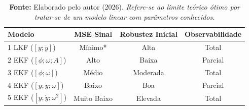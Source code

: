 \documentclass[a4paper,12pt]{article}
\begin{document}
\begin{table}[H]
    \centering
    \caption{Comparativo global de Robustez e Precisão dos Modelos da Senoide}
    \vspace{0.2cm}
    \begin{tabular}{|p{4.0cm}|c|c|c|}
        \hline
        \textbf{Modelo} & \textbf{MSE Sinal} & \textbf{Robustez Inicial} & \textbf{Observabilidade} \\ \hline
        1 LKF ($\left[y; \dot{y}\right]$)         & Mínimo*     & Alta            & Total                    \\ \hline
        2 EKF ($\left[\phi; \omega; A \right]$)   & Alto        & Baixa          & Parcial                  \\ \hline
        3  EKF ($\left[\phi; \omega\right]$)           & Médio       & Moderada       & Total                  \\ \hline
        4 EKF ($\left[y; \dot{y}; \omega \right]$)     &  Baixo      & Boa            & Parcial      \\ \hline
        5 EKF ($\left[y; \dot{y}; \omega^2\right]$) & Muito Baixo & Elevada        & Total                    \\ \hline
    \end{tabular}
    \label{tab:comparativo}
    \caption*{\footnotesize \textbf{Fonte:} Elaborado pelo autor (2026). \newline * \textit{Refere-se ao limite teórico ótimo por tratar-se de um modelo linear com parâmetros conhecidos.}}
\end{table}
\end{document}
